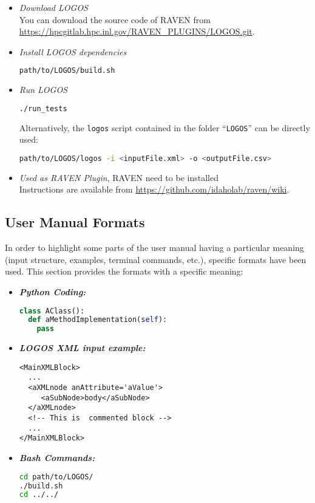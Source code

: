\begin{itemize}
  \item \textit{Download LOGOS}
    \\ You can download the source code of RAVEN from \url{https://hpcgitlab.hpc.inl.gov/RAVEN_PLUGINS/LOGOS.git}.
  \item \textit{Install LOGOS dependencies}
	\begin{lstlisting}[language=bash]
	path/to/LOGOS/build.sh
	\end{lstlisting}
  \item \textit{Run LOGOS}
	\begin{lstlisting}[language=bash]
	./run_tests
	\end{lstlisting}
  	Alternatively, the \texttt{logos} script
    contained in the folder ``\texttt{LOGOS}'' can be directly used:
\begin{lstlisting}[language=bash]
path/to/LOGOS/logos -i <inputFile.xml> -o <outputFile.csv>
\end{lstlisting}
	\item \textit{Used as RAVEN Plugin}, RAVEN need to be installed
		\\ Instructions are available from \url{https://github.com/idaholab/raven/wiki}.
\end{itemize}

\subsection{User Manual Formats}
In order to highlight some parts of the user manual having a particular meaning
(input structure, examples, terminal commands, etc.), specific formats have been used.
This section provides the formats with a specific meaning:
\begin{itemize}
\item \textbf{\textit{Python Coding:}}
\begin{lstlisting}[language=python]
class AClass():
  def aMethodImplementation(self):
    pass
\end{lstlisting}
\item \textbf{\textit{LOGOS XML input example:}}
\begin{lstlisting}[style=XML,morekeywords={anAttribute}]
<MainXMLBlock>
  ...
  <aXMLnode anAttribute='aValue'>
     <aSubNode>body</aSubNode>
  </aXMLnode>
  <!-- This is  commented block -->
  ...
</MainXMLBlock>
\end{lstlisting}
\item \textbf{\textit{Bash Commands:}}
\begin{lstlisting}[language=bash]
cd path/to/LOGOS/
./build.sh
cd ../../
\end{lstlisting}
\end{itemize}

